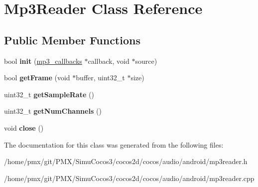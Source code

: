 \hypertarget{classMp3Reader}{}\section{Mp3\+Reader Class Reference}
\label{classMp3Reader}
\subsection*{Public Member Functions}
\begin{DoxyCompactItemize}
\item 
\mbox{\label{classMp3Reader_a13d18df7df84c2a5e16fc88bbdc65761}} 
bool {\bfseries init} (\hyperlink{structmp3__callbacks}{mp3\+\_\+callbacks} $\ast$callback, void $\ast$source)
\item 
\mbox{\label{classMp3Reader_a0d1b3976f4df90a842d0af3eaca104b5}} 
bool {\bfseries get\+Frame} (void $\ast$buffer, uint32\+\_\+t $\ast$size)
\item 
\mbox{\label{classMp3Reader_a6270da27455e05dfec5c2fe42f39ce63}} 
uint32\+\_\+t {\bfseries get\+Sample\+Rate} ()
\item 
\mbox{\label{classMp3Reader_aede2814ae6b1300a2d14c8810e5925e8}} 
uint32\+\_\+t {\bfseries get\+Num\+Channels} ()
\item 
\mbox{\label{classMp3Reader_a8399e8a3f96d30b0569a1fbd9eaa5e03}} 
void {\bfseries close} ()
\end{DoxyCompactItemize}


The documentation for this class was generated from the following files\+:\begin{DoxyCompactItemize}
\item 
/home/pmx/git/\+P\+M\+X/\+Simu\+Cocos3/cocos2d/cocos/audio/android/mp3reader.\+h\item 
/home/pmx/git/\+P\+M\+X/\+Simu\+Cocos3/cocos2d/cocos/audio/android/mp3reader.\+cpp\end{DoxyCompactItemize}
